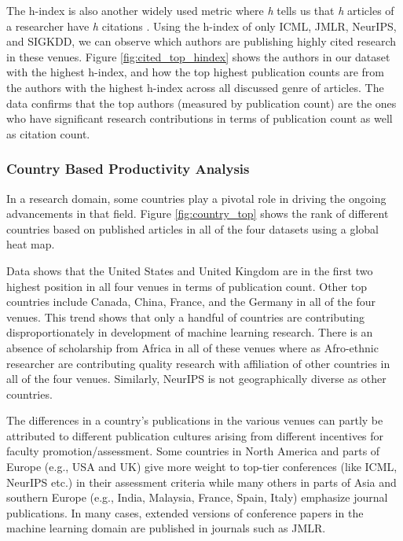 The h-index is also another widely used metric where \textit{h} tells us that \textit{h} articles of a researcher have \textit{h} citations \citep{hirsch2005index}. Using the h-index of only ICML, JMLR, NeurIPS, and SIGKDD, we can observe which authors are publishing highly cited research in these venues. 
Figure \ref{fig:cited_top_hindex} shows the authors in our dataset with the highest h-index, and how the top highest publication counts are from the authors with the highest h-index across all discussed genre of articles. The data confirms that the top authors (measured by publication count) are the ones who have significant research contributions in terms of publication count as well as citation count.



\subsubsection{Country Based Productivity Analysis}

In a research domain, some countries play a pivotal role in driving the ongoing advancements in that field. Figure \ref{fig:country_top} shows the rank of different countries based on published articles in all of the four datasets using a global heat map. 


Data shows that the United States and United Kingdom are in the first two highest position in all four venues in terms of publication count. Other top countries include Canada, China, France, and the Germany in all of the four venues. This trend shows that only a handful of countries are contributing disproportionately in development of machine learning research. There is an absence of scholarship from Africa in all of these venues where as Afro-ethnic researcher are contributing quality research with affiliation of other countries in all of the four venues. Similarly, NeurIPS is not geographically diverse as other countries.


The differences in a country's publications in the various venues can partly be attributed to different publication cultures arising from different incentives for faculty promotion/assessment. Some countries in North America and parts of Europe (e.g., USA and UK) give more weight to top-tier conferences (like ICML, NeurIPS etc.) in their assessment criteria while many others in parts of Asia and southern Europe (e.g., India, Malaysia, France, Spain, Italy) emphasize journal publications. In many cases, extended versions of conference papers in the machine learning domain are published in journals such as JMLR.

